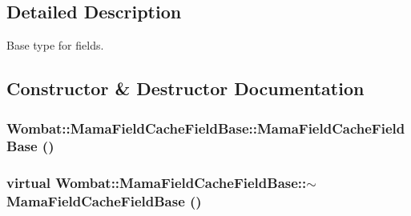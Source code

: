 \subsection{Detailed Description}
Base type for fields. 

\subsection{Constructor \& Destructor Documentation}
\hypertarget{classWombat_1_1MamaFieldCacheFieldBase_ab6fd3c2a0075d9655df2a983e9b3ea0a}{
\subsubsection[{MamaFieldCacheFieldBase}]{\setlength{\rightskip}{0pt plus 5cm}Wombat::MamaFieldCacheFieldBase::MamaFieldCacheFieldBase ()}}
\label{classWombat_1_1MamaFieldCacheFieldBase_ab6fd3c2a0075d9655df2a983e9b3ea0a}
\hypertarget{classWombat_1_1MamaFieldCacheFieldBase_a3edcd5c61a23738ee2a847d4708b41f4}{
\subsubsection[{$\sim$MamaFieldCacheFieldBase}]{\setlength{\rightskip}{0pt plus 5cm}virtual Wombat::MamaFieldCacheFieldBase::$\sim$MamaFieldCacheFieldBase ()}}
\label{classWombat_1_1MamaFieldCacheFieldBase_a3edcd5c61a23738ee2a847d4708b41f4}
